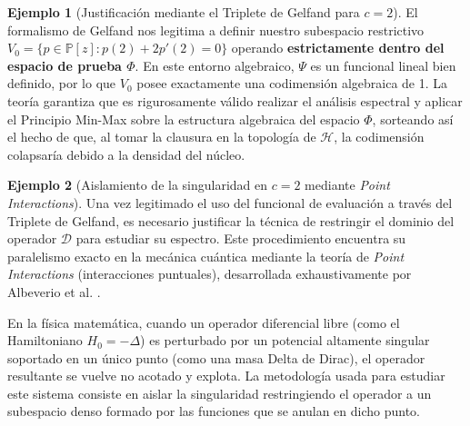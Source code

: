 \documentclass[12pt,a4paper]{article}
\theoremstyle{definition}
\newtheorem{ejemplo}{Ejemplo}
\theoremstyle{remark}
\begin{document}
\begin{ejemplo}[Justificación mediante el Triplete de Gelfand para $c=2$]
    El formalismo de Gelfand nos legitima a definir nuestro subespacio restrictivo $V_0 = \{p \in \mathbb{P}[z] : p(2) + 2p'(2) = 0\}$ operando \textbf{estrictamente dentro del espacio de prueba $\Phi$}. En este entorno algebraico, $\Psi$ es un funcional lineal bien definido, por lo que $V_0$ posee exactamente una codimensión algebraica de 1. La teoría garantiza que es rigurosamente válido realizar el análisis espectral y aplicar el Principio Min-Max sobre la estructura algebraica del espacio $\Phi$, sorteando así el hecho de que, al tomar la clausura en la topología de $\mathcal{H}$, la codimensión colapsaría debido a la densidad del núcleo.
\end{ejemplo}

\begin{ejemplo}[Aislamiento de la singularidad en $c=2$ mediante \textit{Point Interactions}]
    Una vez legitimado el uso del funcional de evaluación a través del Triplete de Gelfand, es necesario justificar la técnica de restringir el dominio del operador $\mathcal{D}$ para estudiar su espectro. Este procedimiento encuentra su paralelismo exacto en la mecánica cuántica mediante la teoría de \textit{Point Interactions} (interacciones puntuales), desarrollada exhaustivamente por Albeverio et al. \cite{albeverio1988solvable}.

    En la física matemática, cuando un operador diferencial libre (como el Hamiltoniano $H_0 = -\Delta$) es perturbado por un potencial altamente singular soportado en un único punto (como una masa Delta de Dirac), el operador resultante se vuelve no acotado y explota. La metodología usada para estudiar este sistema consiste en aislar la singularidad restringiendo el operador a un subespacio denso formado por las funciones que se anulan en dicho punto.


\end{ejemplo}
\end{document}
